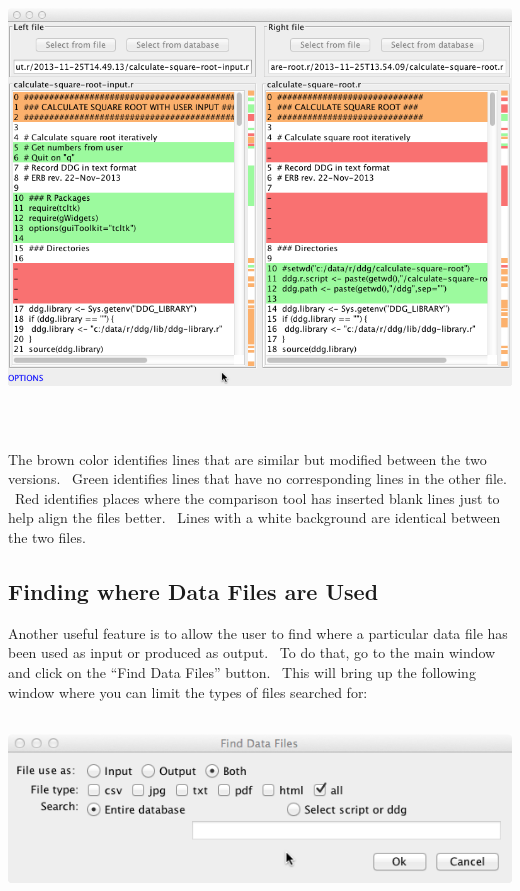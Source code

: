 \documentclass[letterpaper]{article}
\begin{document}
 \includegraphics[width=6.5in,height=4.8752in]{UsingDDGExplorer-img/UsingDDGExplorer-img011.png} 

{\mdseries\upshape\color{black}
The brown color identifies lines that are similar but modified between the two versions. \ Green identifies lines that have no corresponding lines in the other file. \ Red identifies places where the comparison tool has inserted blank lines just to help align the files better. \ Lines with a white background are identical between the two files.}

\subsection{Finding where Data Files are Used}
{\mdseries\upshape\color{black}
Another useful feature is to allow the user to find where a particular data file has been used as input or produced as output. \ To do that, go to the main window and click on the “Find Data Files” button. \ This will bring up the following window where you can limit the types of files searched for:}

 \includegraphics[width=6.5in,height=1.9283in]{UsingDDGExplorer-img/UsingDDGExplorer-img012.png} 
\end{document}
